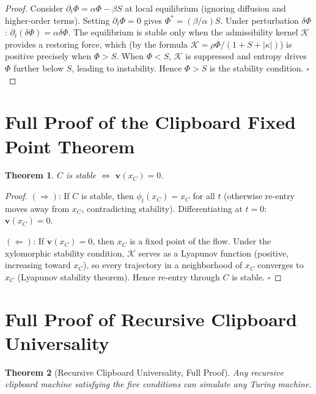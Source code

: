 \documentclass[12pt,oneside]{book}
\theoremstyle{plain}
\newtheorem{theorem}{Theorem}[chapter]
\theoremstyle{definition}
\theoremstyle{plain}
\begin{document}
\begin{proof}
Consider $\partial_t\Phi = \alpha\Phi - \beta S$ at local equilibrium (ignoring diffusion and higher-order terms). Setting $\partial_t\Phi = 0$ gives $\Phi^* = (\beta/\alpha)S$. Under perturbation $\delta\Phi$: $\partial_t(\delta\Phi) = \alpha\delta\Phi$. The equilibrium is stable only when the admissibility kernel $\mathcal{K}$ provides a restoring force, which (by the formula $\mathcal{K} = \rho\Phi/(1+S+|\kappa|)$) is positive precisely when $\Phi > S$. When $\Phi < S$, $\mathcal{K}$ is suppressed and entropy drives $\Phi$ further below $S$, leading to instability. Hence $\Phi > S$ is the stability condition. $\square$
\end{proof}

\section{Full Proof of the Clipboard Fixed Point Theorem}

\begin{theorem}
$C$ is stable $\Longleftrightarrow$ $\mathbf{v}(x_C) = 0$.
\end{theorem}

\begin{proof}
$(\Rightarrow)$: If $C$ is stable, then $\phi_t(x_C) = x_C$ for all $t$ (otherwise re-entry moves away from $x_C$, contradicting stability). Differentiating at $t=0$: $\mathbf{v}(x_C) = 0$.

$(\Leftarrow)$: If $\mathbf{v}(x_C) = 0$, then $x_C$ is a fixed point of the flow. Under the xylomorphic stability condition, $\mathcal{K}$ serves as a Lyapunov function (positive, increasing toward $x_C$), so every trajectory in a neighborhood of $x_C$ converges to $x_C$ (Lyapunov stability theorem). Hence re-entry through $C$ is stable. $\square$
\end{proof}

\section{Full Proof of Recursive Clipboard Universality}

\begin{theorem}[Recursive Clipboard Universality, Full Proof]
\label{thm:rcu_full}
Any recursive clipboard machine satisfying the five conditions can simulate any Turing machine.
\end{theorem}
\end{document}
